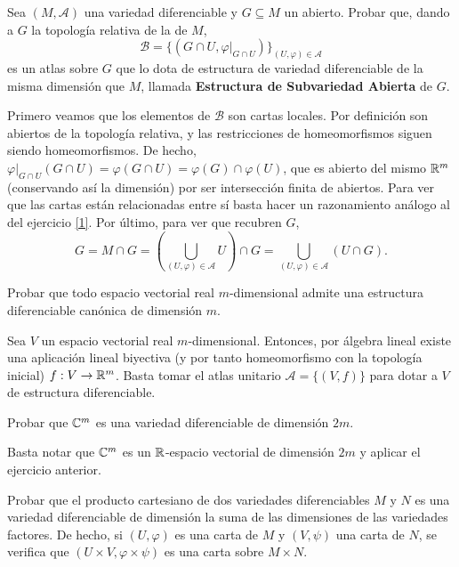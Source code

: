 \documentclass[twoside]{article}
\begin{document}
\newpage

\begin{ejercicio}{4}
Sea $(M,\mathcal{A})$ una variedad diferenciable y $G\subseteq M$ un abierto. Probar que,
dando a $G$ la topología relativa de la de $M$,
$$\mathcal{B} = \{(G \cap U, \varphi|_{G\cap U})\}_{(U,\varphi)\in\mathcal{A}}$$
es un atlas sobre $G$ que lo dota de estructura de variedad diferenciable de la
misma dimensión que $M$, llamada \textbf{Estructura de Subvariedad Abierta}
de $G$.
\end{ejercicio}
\begin{solucion}
Primero veamos que los elementos de $\mathcal{B}$ son cartas locales. Por definición son abiertos de la topología relativa, y las restricciones de homeomorfismos siguen siendo homeomorfismos. De hecho, $\varphi|_{G\cap U}(G\cap U)=\varphi(G\cap U)=\varphi(G)\cap\varphi(U)$, que es abierto del mismo $\mathbb{R}^m$ (conservando así la dimensión) por ser intersección finita de abiertos. Para ver que las cartas están relacionadas entre sí basta hacer un razonamiento  análogo al del ejercicio \ref{1}. Por último, para ver que recubren $G$, 
$$G=M\cap G=\left(\bigcup_{(U,\varphi)\in\mathcal{A}}U\right)\cap G= \bigcup_{(U,\varphi)\in\mathcal{A}}(U\cap G).$$
\end{solucion}
\newpage
\begin{ejercicio}{5}
Probar que todo espacio vectorial real $m$-dimensional admite una estructura
diferenciable canónica de dimensión $m$.
\end{ejercicio}
\begin{solucion}
Sea $V$ un espacio vectorial real $m$-dimensional. Entonces, por álgebra lineal existe una aplicación lineal biyectiva (y por tanto homeomorfismo con la topología inicial) $f:V\to\mathbb{R}^m$. Basta tomar el atlas unitario $\mathcal{A}=\{(V,f)\}$ para dotar a $V$ de estructura diferenciable.  
\end{solucion}
\newpage
\begin{ejercicio}{6}
Probar que $\mathbb{C}^m$ es una variedad diferenciable de dimensión $2m$.
\end{ejercicio}
\begin{solucion}
Basta notar que $\mathbb{C}^m$ es un $\mathbb{R}$-espacio vectorial de dimensión $2m$ y aplicar el ejercicio anterior.
\end{solucion}
\newpage
\begin{ejercicio}{7}
Probar que el producto cartesiano de dos variedades diferenciables $M$ y $N$
es una variedad diferenciable de dimensión la suma de las dimensiones de
las variedades factores. De hecho, si $(U,\varphi)$ es una carta de $M$ y $(V,\psi )$ una
carta de $N$, se verifica que $(U \times V,\varphi\times\psi )$ es una carta sobre $M \times N$.
\end{ejercicio}
\end{document}
